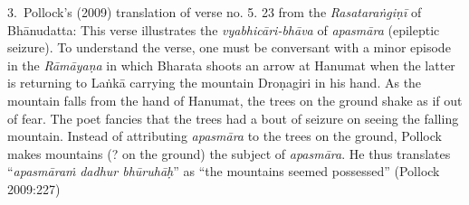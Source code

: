 3.~Pollock’s (2009) translation of verse no. 5. 23 from the \textsl{Rasataraṅgiṇī} of Bhānudatta: This verse illustrates the \textsl{vyabhicāri-bhāva} of \textsl{apasmāra} (epileptic seizure). To understand the verse, one must be conversant with a minor episode in the \textsl{Rāmāyaṇa} in which Bharata shoots an arrow at Hanumat when the latter is returning to Laṅkā carrying the mountain Droṇagiri in his hand. As the mountain falls from the hand of Hanumat, the trees on the ground shake as if out of fear. The poet fancies that the trees had a bout of seizure on seeing the falling mountain. Instead of attributing \textsl{apasmāra} to the trees on the ground, Pollock makes mountains (? on the ground) the subject of \textsl{apasmāra}. He thus translates “\textsl{apasmāraṁ} \textsl{dadhur bhūruhāḥ}” as “the mountains seemed possessed” (Pollock 2009:227)
